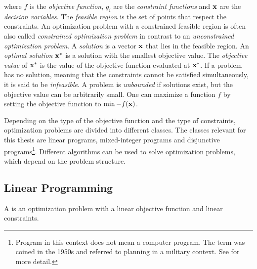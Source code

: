 \quad where $f$ is the \textit{objective function}, $g_i$ are the \textit{constraint functions} and $\bold x$ are the \textit{decision variables}. %
The \textit{feasible region} is the set of points that respect the constraints. An optimization problem with a constrained feasible region is often also called \textit{constrained optimization problem} in contrast to an \textit{unconstrained optimization problem}. A \textit{solution} is a vector $\bold x$ that lies in the feasible region. An \textit{optimal solution} $\bold x^*$ is a solution with the smallest objective value. The \textit{objective value} of $\bold x^*$ is the value of the objective function evaluated at $\bold x^*$. If a problem has no solution, meaning that the constraints cannot be satisfied simultaneously, it is said to be \textit{infeasible}. A problem is \textit{unbounded} if solutions exist, but the objective value can be arbitrarily small.
One can maximize a function $f$ by setting the objective function to $\min -f(\bold x)$.

Depending on the type of the objective function and the type of constraints, optimization problems are divided into different classes. The classes relevant for this thesis are linear programs, mixed-integer programs and disjunctive programs\footnote[1]{Program in this context does not mean a computer program. The term was coined in the 1950s and referred to planning in a military context. See \cite{understanding_lp} for more detail.}. 
Different algorithms can be used to solve optimization problems, which depend on the problem structure.

\subsection{Linear Programming} \label{section:Linear Programming}
A  is an optimization problem with a linear objective function and linear constraints.



